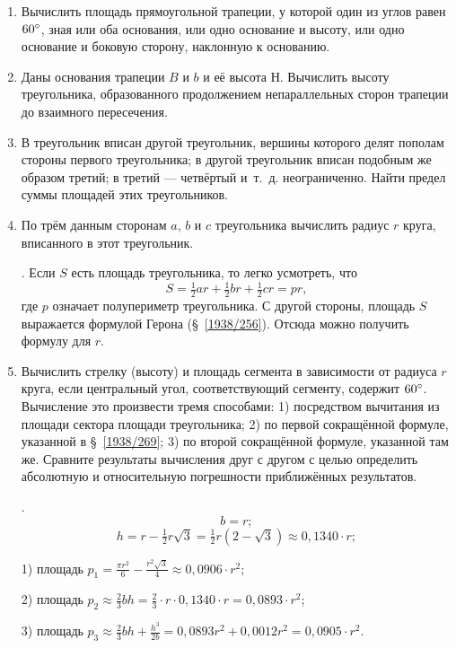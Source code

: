\documentclass[twoside]{book}
\begin{document}
\begin{enumerate}[resume]


 \item
Вычислить площадь прямоугольной трапеции, у которой один из углов равен $60\degree$, зная или оба основания, или одно основание и высоту, или одно основание и боковую сторону, наклонную к основанию.

 \item
Даны основания трапеции $B$ и $b$ и её высота Н.
Вычислить высоту треугольника, образованного продолжением непараллельных сторон трапеции до взаимного пересечения.

 \item
В треугольник вписан другой треугольник, вершины которого делят пополам стороны первого треугольника;
в другой треугольник вписан подобным же образом третий;
в третий — четвёртый и~т.~д.
неограниченно.
Найти предел суммы площадей этих треугольников.

 \item
По трём данным сторонам $a$, $b$ и $c$ треугольника вычислить радиус $r$ круга, вписанного в этот треугольник.

\smallskip
{}.
Если $S$ есть площадь треугольника, то легко усмотреть, что
\[S=\tfrac12 ar+\tfrac12 br+\tfrac12 cr=pr,\]
где $p$ означает полупериметр треугольника.
С другой стороны, площадь $S$ выражается формулой Герона (§~\ref{1938/256}).
Отсюда можно получить формулу для $r$.


 \item
Вычислить стрелку (высоту) и площадь сегмента в зависимости от радиуса $r$ круга, если центральный угол, соответствующий сегменту, содержит $60\degree$.
Вычисление это произвести тремя способами:
1) посредством вычитания из площади сектора площади треугольника;
2) по первой сокращённой формуле, указанной в §~\ref{1938/269};
3) по второй сокращённой формуле, указанной там же.
Сравните результаты вычисления друг с другом с целью определить абсолютную и относительную погрешности приближённых результатов.

\smallskip
{}.
\[b=r;\]
\[h=r-\tfrac12 r\sqrt3=\tfrac12 r(2-\sqrt3)\approx 0{,}1340\cdot r;\]

1) площадь $p_1=\frac{\pi r^2}{6}-\frac{r^2\sqrt3}{4}\approx 0{,}0906\cdot r^2$;

2) площадь $p_2\approx \tfrac23 bh=\tfrac23\cdot r\cdot 0{,}1340\cdot r=0{,}0893\cdot r^2$;

3) площадь $p_3\approx \tfrac23 bh+\frac{h^3}{2b}=0{,}0893r^2+0{,}0012r^2=0{,}0905\cdot r^2$.


\end{enumerate}
\end{document}
